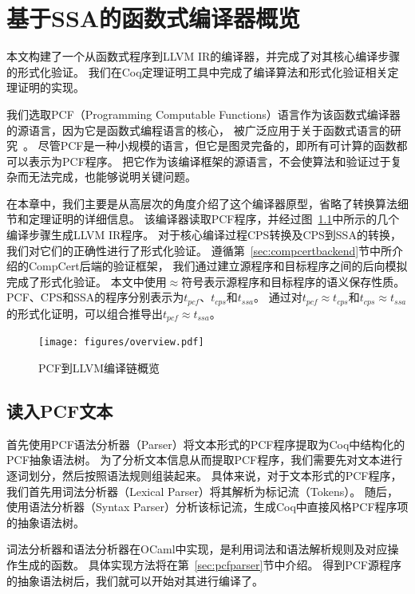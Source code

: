 
\chapter{基于SSA的函数式编译器概览} \label{sec:overview}

本文构建了一个从函数式程序到LLVM IR的编译器，并完成了对其核心编译步骤的形式化验证。
我们在Coq定理证明工具中完成了编译算法和形式化验证相关定理证明的实现。

我们选取PCF（Programming Computable Functions）语言作为该函数式编译器的源语言，因为它是函数式编程语言的核心，
被广泛应用于关于函数式语言的研究~\cite{plotkin1977lcf,ABRAMSKY2000409}。
尽管PCF是一种小规模的语言，但它是图灵完备的，即所有可计算的函数都可以表示为PCF程序。
把它作为该编译框架的源语言，不会使算法和验证过于复杂而无法完成，也能够说明关键问题。

在本章中，我们主要是从高层次的角度介绍了这个编译器原型，省略了转换算法细节和定理证明的详细信息。
该编译器读取PCF程序，并经过图~\ref{overview}中所示的几个编译步骤生成LLVM IR程序。
对于核心编译过程CPS转换及CPS到SSA的转换，我们对它们的正确性进行了形式化验证。
遵循第~\ref{sec:compcertbackend}节中所介绍的CompCert后端的验证框架，
我们通过建立源程序和目标程序之间的后向模拟完成了形式化验证。
本文中使用$\approx $符号表示源程序和目标程序的语义保存性质。
PCF、CPS和SSA的程序分别表示为$t_{pcf}$、$t_{cps}$和$t_{ssa}$。
通过对$t_{pcf}\approx t_{cps}$和$t_{cps}\approx t_{ssa}$的形式化证明，可以组合推导出$t_{pcf}\approx t_{ssa}$。

\begin{figure}[htbp]
    \centering
    \vspace{2ex}
    \texttt{[image: figures/overview.pdf]}
    \caption{PCF到LLVM编译链概览}\label{overview}
\end{figure}

\section{读入PCF文本}

首先使用PCF语法分析器（Parser）将文本形式的PCF程序提取为Coq中结构化的PCF抽象语法树。
为了分析文本信息从而提取PCF程序，我们需要先对文本进行逐词划分，然后按照语法规则组装起来。
具体来说，对于文本形式的PCF程序，
我们首先用词法分析器（Lexical Parser）将其解析为标记流（Tokens）。
随后，使用语法分析器（Syntax Parser）分析该标记流，生成Coq中直接风格PCF程序项的抽象语法树。

词法分析器和语法分析器在OCaml中实现，是利用词法和语法解析规则及对应操作生成的函数。
具体实现方法将在第~\ref{sec:pcfparser}节中介绍。
得到PCF源程序的抽象语法树后，我们就可以开始对其进行编译了。

